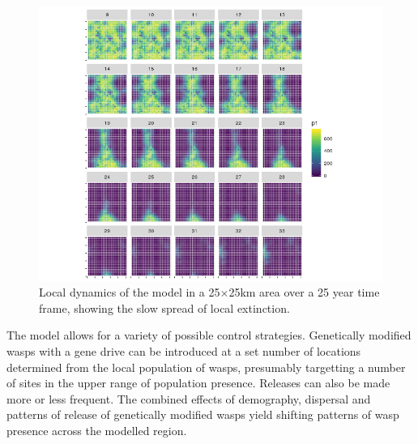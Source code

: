 \documentclass[11pt]{article}
\begin{document}
\begin{figure}[hbt]
  \begin{center}
    \includegraphics[width=\textwidth]{local_dynamics}
    \caption{Local dynamics of the model in a 25$\times$25km area over a 25 year time frame, showing the slow spread of local extinction.}\label{fig:local-dynamics}
  \end{center}
\end{figure} %
The model allows for a variety of possible control strategies.
Genetically modified wasps with a gene drive can be introduced at a set number of locations determined from the local population of wasps, presumably targetting a number of sites in the upper range of population presence.
Releases can also be made more or less frequent.
The combined effects of demography, dispersal and patterns of release of genetically modified wasps yield shifting patterns of wasp presence across the modelled region.
\par
%
%
\end{document}
